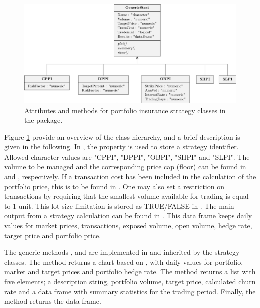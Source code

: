 \begin{figure}[ht!]
\includegraphics [scale = 0.7] {strategy_classes.pdf}
\caption{Attributes and methods for portfolio insurance strategy classes in the  package.}
\label{fig:strategy_classes}
\end{figure}


Figure \ref{fig:strategy_classes} provide an overview of the class hierarchy, and a brief description is given in the following. In , the  property is used to store a strategy identifier. Allowed character values are "CPPI", "DPPI", "OBPI", "SHPI" and "SLPI". The volume to be managed and the corresponding price cap (floor) can be found in  and , respectively. If a transaction cost has been included in the calculation of the portfolio price, this is to be found in . One may also set a restriction on transactions by requiring that the smallest volume available for trading is equal to 1 unit. This lot size limitation is stored as TRUE/FALSE in . The main output from a strategy calculation can be found in . This data frame keeps daily values for market prices, transactions, exposed volume, open volume, hedge rate, target price and portfolio price. 

The generic methods ,  and  are implemented in  and inherited by the strategy classes. The  method returns a chart based on , with daily values for portfolio, market and target prices and portfolio hedge rate. The  method returns a list with five elements; a description string, portfolio volume, target price, calculated churn rate and a data frame with summary statistics for the trading period. Finally, the  method returns the  data frame.

